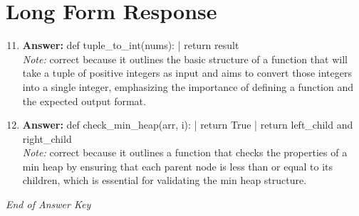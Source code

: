 \documentclass[12pt]{article}
\begin{document}
\section*{Long Form Response}
\begin{enumerate}[label=\arabic*.]
\setcounter{enumi}{10}
\item \textbf{Answer:} def tuple\_to\_int(nums): | return result
\\ \textit{Note:} correct because it outlines the basic structure of a function that will take a tuple of positive integers as input and aims to convert those integers into a single integer, emphasizing the importance of defining a function and the expected output format.
\item \textbf{Answer:} def check\_min\_heap(arr, i): | return True | return left\_child and right\_child
\\ \textit{Note:} correct because it outlines a function that checks the properties of a min heap by ensuring that each parent node is less than or equal to its children, which is essential for validating the min heap structure.
\end{enumerate}

\vfill
\noindent\textit{End of Answer Key}
\end{document}
